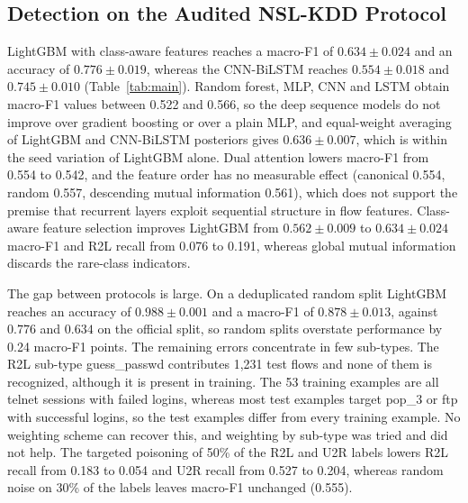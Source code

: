 \documentclass[journal]{IEEEtran}
\begin{document}
\begin{table}[t]
\centering
\caption{Duplicate audit of the three benchmarks.}
\label{tab:audit}
\small
\resizebox{\textwidth}{!}{}
\end{table}

\subsection{Detection on the Audited NSL-KDD Protocol}
LightGBM with class-aware features reaches a macro-F1 of $0.634\pm0.024$ and an accuracy of $0.776\pm0.019$, whereas the CNN-BiLSTM reaches $0.554\pm0.018$ and $0.745\pm0.010$ (Table~\ref{tab:main}). Random forest, MLP, CNN and LSTM obtain macro-F1 values between 0.522 and 0.566, so the deep sequence models do not improve over gradient boosting or over a plain MLP, and equal-weight averaging of LightGBM and CNN-BiLSTM posteriors gives $0.636\pm0.007$, which is within the seed variation of LightGBM alone. Dual attention lowers macro-F1 from 0.554 to 0.542, and the feature order has no measurable effect (canonical 0.554, random 0.557, descending mutual information 0.561), which does not support the premise that recurrent layers exploit sequential structure in flow features. Class-aware feature selection improves LightGBM from $0.562\pm0.009$ to $0.634\pm0.024$ macro-F1 and R2L recall from 0.076 to 0.191, whereas global mutual information discards the rare-class indicators.

\begin{table}[t]
\centering
\caption{NSL-KDD, official overlap-free test set, mean $\pm$ standard deviation over seeds.}
\label{tab:main}
\scriptsize
\setlength{\tabcolsep}{3pt}
\resizebox{\textwidth}{!}{}
\end{table}

The gap between protocols is large. On a deduplicated random split LightGBM reaches an accuracy of $0.988\pm0.001$ and a macro-F1 of $0.878\pm0.013$, against $0.776$ and $0.634$ on the official split, so random splits overstate performance by 0.24 macro-F1 points. The remaining errors concentrate in few sub-types. The R2L sub-type guess\_passwd contributes 1,231 test flows and none of them is recognized, although it is present in training. The 53 training examples are all telnet sessions with failed logins, whereas most test examples target pop\_3 or ftp with successful logins, so the test examples differ from every training example. No weighting scheme can recover this, and weighting by sub-type was tried and did not help. The targeted poisoning of 50\% of the R2L and U2R labels lowers R2L recall from 0.183 to 0.054 and U2R recall from 0.527 to 0.204, whereas random noise on 30\% of the labels leaves macro-F1 unchanged (0.555).
\end{document}
